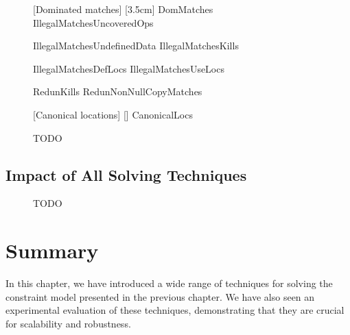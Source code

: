 \begin{figure}
  \centering

                      [Dominated matches]%
                      [3.5cm]%
                      {DomMatches}%
  \hfill%
                      {IllegalMatchesUncoveredOps}

  \vspace{\betweensubfigures}

                      {IllegalMatchesUndefinedData}%
  \hfill%
                      {IllegalMatchesKills}%

  \vspace{\betweensubfigures}

                      {IllegalMatchesDefLocs}%
  \hfill%
                      {IllegalMatchesUseLocs}

  \vspace{\betweensubfigures}

                      {RedunKills}%
  \hfill%
                      {RedunNonNullCopyMatches}

  \vspace{\betweensubfigures}

                      [Canonical locations]%
                      [\linewidth]%
                      {CanonicalLocs}

  \caption{TODO}
\end{figure}


\subsection{Impact of All Solving Techniques}

\begin{figure}
  \centering%

  \caption{TODO}
\end{figure}


\section{Summary}

In this chapter, we have introduced a wide range of techniques for solving the
\gls{constraint model} presented in the previous chapter.
%
We have also seen an experimental evaluation of these techniques, demonstrating
that they are crucial for scalability and robustness.
